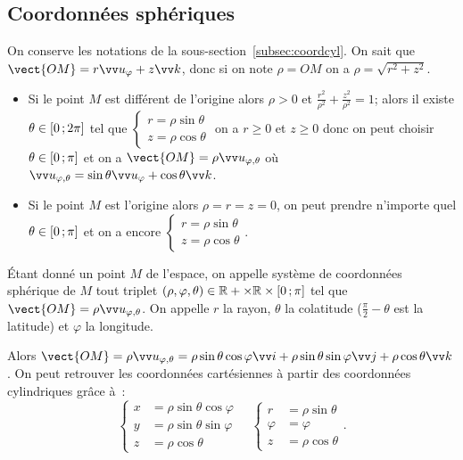 \subsection{Coordonnées sphériques}
On conserve les notations de la sous-section~\ref{subsec:coordcyl}. On sait que $\vect{OM}=r\vu_\varphi+z\vk$, donc si on note $\rho=OM$ on a $\rho=\sqrt{r^2+z^2}$. 
\begin{itemize}
\item Si le point $M$ est différent de l'origine alors $\rho>0$ et $\frac{r^2}{\rho^2}+\frac{z^2}{\rho^2}=1$; alors il existe $\theta\in \left[ 0 \, ;  2\pi \right]$ tel que $\begin{cases}r=\rho\sin\theta\\ z=\rho\cos\theta\end{cases}$ on a $r\geq 0$ et $z\geq 0$ donc on peut choisir $\theta\in \left[ 0 \, ;  \pi \right]$ et on a $\vect{OM}=\rho\vu_{\varphi,\theta}$ où $\vu_{\varphi,\theta}=\sin\theta\vu_\varphi+\cos\theta\vk$.
\item Si le point $M$ est l'origine alors $\rho=r=z=0$, on peut prendre n'importe quel $\theta \in \left[ 0 \, ;  \pi \right]$ et on a encore $\begin{cases}r=\rho\sin\theta\\ z=\rho\cos\theta\end{cases}$.
\end{itemize}
\begin{defdef}
  Étant donné un point $M$ de l'espace, on appelle système de coordonnées sphérique de $M$ tout triplet $(\rho,\varphi,\theta)\in\mathbb{R}+\times\mathbb{R}\times \left[ 0 \, ;  \pi \right]$ tel que $\vect{OM}=\rho\vu_{\varphi,\theta}$. On appelle $r$ la rayon, $\theta$ la colatitude ($\frac{\pi}{2}-\theta$ est la latitude) et $\varphi$ la longitude.
\end{defdef}
Alors $\vect{OM}=\rho\vu_{\varphi,\theta}=\rho\sin\theta\cos\varphi\vi+\rho\sin\theta\sin\varphi\vj+\rho\cos\theta\vk$. On peut retrouver les coordonnées cartésiennes à partir des coordonnées cylindriques grâce à~:
\begin{equation}
  \begin{cases}
    x&=\rho\sin\theta\cos\varphi\\ y&=\rho\sin\theta\sin\varphi\\ z&=\rho\cos\theta
  \end{cases}
\quad
  \begin{cases}
    r&=\rho\sin\theta\\ \varphi&=\varphi\\ z&=\rho\cos\theta
  \end{cases}.
\end{equation}
